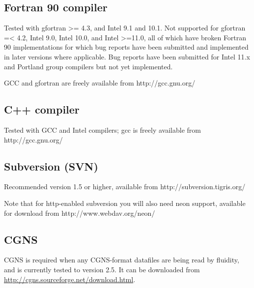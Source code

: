 \subsection{Fortran 90 compiler}
\label{sect:required_libraries_f90_compiler}

Tested with gfortran >= 4.3, and Intel 9.1 and 10.1. Not supported for gfortran
=< 4.2, Intel 9.0, Intel 10.0, and Intel >=11.0, all of which have broken
Fortran 90 implementations for which bug reports have been submitted and
implemented in later versions where applicable. Bug reports have been submitted
for Intel 11.x and Portland group compilers but not yet implemented.

GCC and gfortran are freely available from http://gcc.gnu.org/

\subsection{C++ compiler}
\label{sect:required_libraries_c++_compiler}

Tested with GCC and Intel compilers; gcc is freely available from
http://gcc.gnu.org/

\subsection{Subversion (SVN)}
\label{sect:required_libraries_svn}

Recommended version 1.5 or higher, available from http://subversion.tigris.org/

Note that for http-enabled subversion you will also need neon support,
available for download from http://www.webdav.org/neon/

\subsection{CGNS}
\label{sect:required_libraries_cgns}

CGNS is required when any CGNS-format datafiles are being read by fluidity, and
is currently tested to version 2.5. It can be downloaded from 
\url{http://cgns.sourceforge.net/download.html}.


